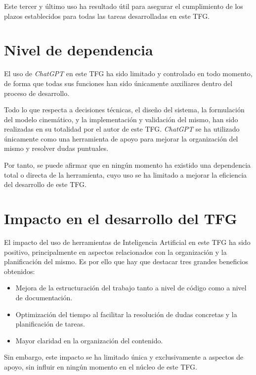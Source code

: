 Este tercer y último uso ha resultado útil para asegurar el cumplimiento de los plazos establecidos para todas las tareas desarrolladas en este TFG.

\section{Nivel de dependencia}
\label{sec:segundaseccion}

El uso de \textit{ChatGPT} en este TFG ha sido limitado y controlado en todo momento, de forma que todas sus funciones han sido únicamente auxiliares dentro del proceso de desarrollo.

\vspace{0.25cm}

Todo lo que respecta a decisiones técnicas, el diseño del sistema, la formulación del modelo cinemático, y la implementación y validación del mismo, han sido realizadas en su totalidad por el autor de este TFG. \textit{ChatGPT} se ha utilizado únicamente como una herramienta de apoyo para mejorar la organización del mismo y resolver dudas puntuales.

\vspace{0.25cm}

Por tanto, se puede afirmar que en ningún momento ha existido una dependencia total o directa de la herramienta, cuyo uso se ha limitado a mejorar la eficiencia del desarrollo de este TFG.

\section{Impacto en el desarrollo del TFG}
\label{sec:segundaseccion}

El impacto del uso de herramientas de Inteligencia Artificial en este TFG ha sido positivo, principalmente en aspectos relacionados con la organización y la planificación del mismo. Es por ello que hay que destacar tres grandes beneficios obtenidos:

\begin{itemize}
\item Mejora de la estructuración del trabajo tanto a nivel de código como a nivel de documentación.
\item Optimización del tiempo al facilitar la resolución de dudas concretas y la planificación de tareas.
\item Mayor claridad en la organización del contenido.
\end{itemize}

Sin embargo, este impacto se ha limitado única y exclusivamente a aspectos de apoyo, sin influir en ningún momento en el núcleo de este TFG.

